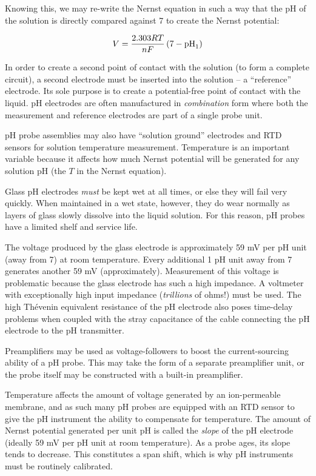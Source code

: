 Knowing this, we may re-write the Nernst equation in such a way that the pH of the solution is directly compared against 7 to create the Nernst potential:

$$V = {{2.303 R T} \over {nF}} \left(7 - \hbox{pH}_1 \right)$$

In order to create a second point of contact with the solution (to form a complete circuit), a second electrode must be inserted into the solution -- a ``reference'' electrode.  Its sole purpose is to create a potential-free point of contact with the liquid.  pH electrodes are often manufactured in {\it combination} form where both the measurement and reference electrodes are part of a single probe unit.

pH probe assemblies may also have ``solution ground'' electrodes and RTD sensors for solution temperature measurement.  Temperature is an important variable because it affects how much Nernst potential will be generated for any solution pH (the $T$ in the Nernst equation).

Glass pH electrodes {\it must} be kept wet at all times, or else they will fail very quickly.  When maintained in a wet state, however, they do wear normally as layers of glass slowly dissolve into the liquid solution.  For this reason, pH probes have a limited shelf and service life.

\vskip 10pt

The voltage produced by the glass electrode is approximately 59 mV per pH unit (away from 7) at room temperature.  Every additional 1 pH unit away from 7 generates another 59 mV (approximately).  Measurement of this voltage is problematic because the glass electrode has such a high impedance.  A voltmeter with exceptionally high input impedance ({\it trillions} of ohms!) must be used.  The high Th\'evenin equivalent resistance of the pH electrode also poses time-delay problems when coupled with the stray capacitance of the cable connecting the pH electrode to the pH transmitter.

Preamplifiers may be used as voltage-followers to boost the current-sourcing ability of a pH probe.  This may take the form of a separate preamplifier unit, or the probe itself may be constructed with a built-in preamplifier.

\vskip 10pt

Temperature affects the amount of voltage generated by an ion-permeable membrane, and as such many pH probes are equipped with an RTD sensor to give the pH instrument the ability to compensate for temperature.  The amount of Nernst potential generated per unit pH is called the {\it slope} of the pH electrode (ideally 59 mV per pH unit at room temperature).  As a probe ages, its slope tends to decrease.  This constitutes a span shift, which is why pH instruments must be routinely calibrated.

